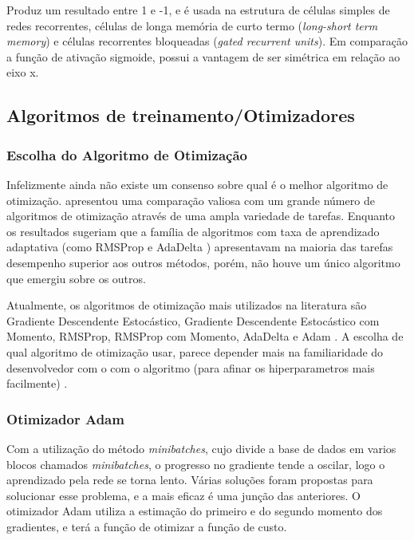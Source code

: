 \documentclass[12pt]{article}
\begin{document}
Produz um resultado entre 1 e -1, e é usada na estrutura de células simples de redes recorrentes, células de longa memória de curto termo (\textit{long-short term memory}) e células recorrentes bloqueadas (\textit{gated recurrent units}). Em comparação a função de ativação sigmoide, possui a vantagem de ser simétrica em relação ao eixo x.

\subsection{Algoritmos de treinamento/Otimizadores}

\subsubsection{Escolha do Algoritmo de Otimização}

Infelizmente ainda não existe um consenso sobre qual é o melhor algoritmo de otimização. \cite{DBLP:journals/corr/SchaulAS13} apresentou uma comparação valiosa com um grande número de algoritmos de otimização através de uma ampla variedade de tarefas. Enquanto os resultados sugeriam que a família de algoritmos com taxa de aprendizado adaptativa (como RMSProp e AdaDelta \cite{DBLP:journals/corr/abs-1212-5701}) apresentavam na maioria das tarefas desempenho superior aos outros métodos, porém, não houve um único algoritmo que emergiu sobre os outros.

Atualmente, os algoritmos de otimização mais utilizados na literatura são Gradiente Descendente Estocástico, Gradiente Descendente Estocástico com Momento, RMSProp, RMSProp com Momento, AdaDelta \cite{DBLP:journals/corr/Ruder16} e Adam \cite{DBLP:journals/corr/KingmaB14}. A escolha de qual algoritmo de otimização usar, parece depender mais na familiaridade do desenvolvedor com o com o algoritmo (para afinar os hiperparametros mais facilmente) \cite{Goodfellow-et-al-2016}.

\subsubsection{Otimizador Adam}

Com a utilização do método \textit{minibatches}, cujo divide a base de dados em varios blocos chamados \textit{minibatches}, o progresso no gradiente tende a oscilar, logo o aprendizado pela rede se torna lento. Várias soluções foram propostas para solucionar esse problema, e a mais eficaz é uma junção das anteriores. O otimizador Adam \cite{DBLP:journals/corr/KingmaB14} utiliza a estimação do primeiro e do segundo momento dos gradientes, e terá a função de otimizar a função de custo.
\end{document}
